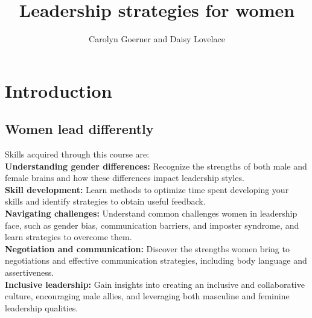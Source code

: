 \documentclass[12pt]{article}
\begin{document}

\title{\textbf{Leadership strategies for women}}
\author{ Carolyn Goerner and Daisy Lovelace}
\maketitle

\newpage
\tableofcontents
\newpage
\listoffigures
\newpage
\listoftables

\newpage
\section{Introduction}

\subsection{Women lead differently}
Skills acquired through this course are:\\
\textbf{Understanding gender differences:} Recognize the strengths of both male and female brains and how these differences impact leadership styles.\\
\textbf{Skill development:} Learn methods to optimize time spent developing your skills and identify strategies to obtain useful feedback.\\
\textbf{Navigating challenges:} Understand common challenges women in leadership face, such as gender bias, communication barriers, and imposter syndrome, and learn strategies to overcome them.\\
\textbf{Negotiation and communication:} Discover the strengths women bring to negotiations and effective communication strategies, including body language and assertiveness.\\
\textbf{Inclusive leadership:} Gain insights into creating an inclusive and collaborative culture, encouraging male allies, and leveraging both masculine and feminine leadership qualities.\\

\end{document}
